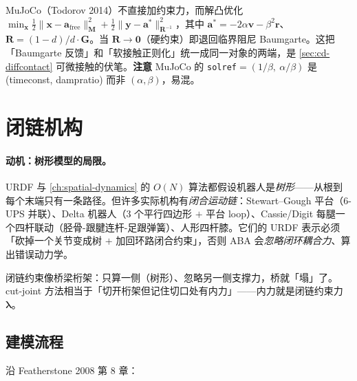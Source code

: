 \begin{insight}[MuJoCo 软约束 = 软化的 Baumgarte]
MuJoCo（Todorov 2014）不直接加约束力，而解凸优化 $\min_{\mathbf x}\tfrac12\|\mathbf x-\mathbf a_{\text{free}}\|_{\mathbf M}^2+\tfrac12\|\mathbf y-\mathbf a^*\|_{\mathbf R^{-1}}^2$，其中 $\mathbf a^*=-2\alpha\mathbf v-\beta^2\mathbf r$、$\mathbf R=(1-d)/d\cdot\mathbf G$。当 $\mathbf R\to\mathbf 0$（硬约束）即退回临界阻尼 Baumgarte。这把「Baumgarte 反馈」和「软接触正则化」统一成同一对象的两端，是 \cref{sec:cd-diffcontact} 可微接触的伏笔。\textbf{注意} MuJoCo 的 \texttt{solref}$=(1/\beta,\ \alpha/\beta)$ 是 (timeconst, dampratio) 而非 $(\alpha,\beta)$，易混。
\end{insight}

\section{闭链机构}
\label{sec:cd-loop}

\paragraph{动机：树形模型的局限。}
URDF 与 \cref{ch:spatial-dynamics} 的 $O(N)$ 算法都假设机器人是\emph{树形}——从根到每个末端只有一条路径。但许多实际机构有\emph{闭合运动链}：Stewart--Gough 平台（6-UPS 并联）、Delta 机器人（$3$ 个平行四边形 $+$ 平台 loop）、Cassie/Digit 每腿一个四杆联动（胫骨-跟腱连杆-足跟弹簧）、人形四杆膝。它们的 URDF 表示必须「砍掉一个关节变成树 $+$ 加回环路闭合约束」，否则 ABA 会\emph{忽略闭环耦合力}、算出错误动力学。

\begin{insight}[闭链像桁架]
闭链约束像桥梁桁架：只算一侧（树形）、忽略另一侧支撑力，桥就「塌」了。cut-joint 方法相当于「切开桁架但记住切口处有内力」——内力就是闭链约束力 $\boldsymbol\lambda$。
\end{insight}

\subsection{建模流程}
沿 Featherstone 2008 第 8 章\cite{featherstone2008rigid}：

